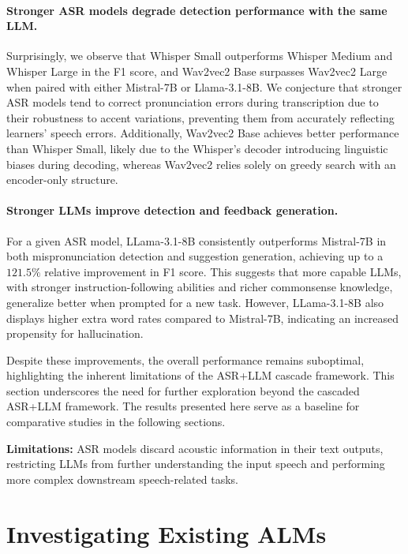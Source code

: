 \documentclass[11pt]{article}
\begin{document}
\paragraph{Stronger ASR models degrade detection performance with the same LLM.} Surprisingly, we observe that Whisper Small outperforms Whisper Medium and Whisper Large in the F1 score, and Wav2vec2 Base surpasses Wav2vec2 Large when paired with either Mistral-7B or Llama-3.1-8B. We conjecture that stronger ASR models tend to correct pronunciation errors during transcription due to their robustness to accent variations, preventing them from accurately reflecting learners' speech errors. Additionally, Wav2vec2 Base achieves better performance than Whisper Small, likely due to the Whisper's decoder introducing linguistic biases during decoding, whereas Wav2vec2 relies solely on greedy search with an encoder-only structure.  


\paragraph{Stronger LLMs improve detection and feedback generation.} For a given ASR model, LLama-3.1-8B consistently outperforms Mistral-7B in both mispronunciation detection and suggestion generation, achieving up to a $121.5\%$ relative improvement in F1 score. This suggests that more capable LLMs, with stronger instruction-following abilities and richer commonsense knowledge, generalize better when prompted for a new task. However, LLama-3.1-8B also displays higher extra word rates compared to Mistral-7B, indicating an increased propensity for hallucination.

Despite these improvements, the overall performance remains suboptimal, highlighting the inherent limitations of the ASR+LLM cascade framework. This section underscores the need for further exploration beyond the cascaded ASR+LLM framework. The results presented here serve as a baseline for comparative studies in the following sections.



\begin{abox} 
     \textbf{Limitations:}  ASR models discard acoustic information in their text outputs, restricting LLMs from further understanding the input speech and performing more complex downstream speech-related tasks.
\end{abox}



\section{Investigating Existing ALMs}
\label{sec:alms}
\end{document}
